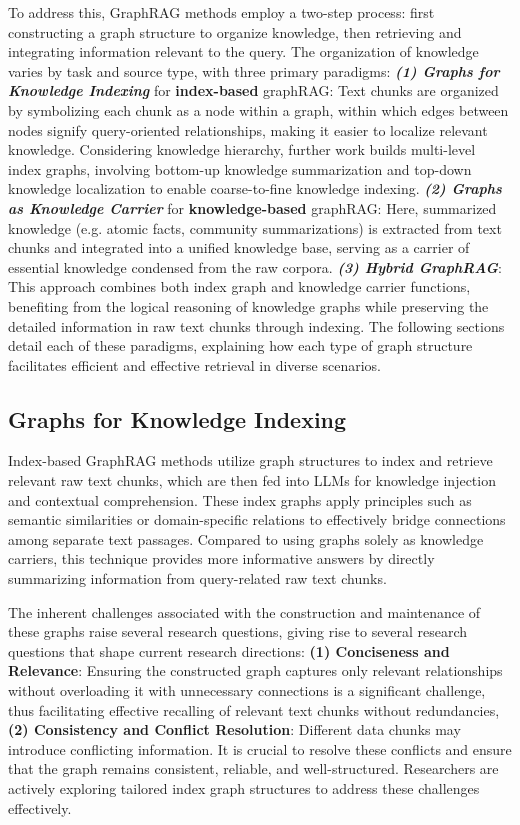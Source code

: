 \documentclass[lettersize,journal]{IEEEtran}
\begin{document}
To address this, GraphRAG methods employ a two-step process: first constructing a graph structure to organize knowledge, then retrieving and integrating information relevant to the query. The organization of knowledge varies by task and source type, with three primary paradigms:
\textbf{\textit{ (1) Graphs for Knowledge Indexing}} for {\bf index-based} graphRAG: Text chunks are organized by symbolizing each chunk as a node within a graph, within which edges between nodes signify query-oriented relationships, making it easier to localize relevant knowledge. Considering knowledge hierarchy, further work builds multi-level index graphs, involving bottom-up knowledge summarization and top-down knowledge localization to enable coarse-to-fine knowledge indexing.
\textbf{ \textit{ (2) Graphs as Knowledge Carrier}} for {\bf knowledge-based} graphRAG: Here, summarized knowledge (e.g. atomic facts, community summarizations) is extracted from text chunks and integrated into a unified knowledge base, serving as a carrier of essential knowledge condensed from the raw corpora.
{\bf \textit{ (3) Hybrid GraphRAG}}: This approach combines both index graph and knowledge carrier functions, benefiting from the logical reasoning of knowledge graphs while preserving the detailed information in raw text chunks through indexing. The following sections detail each of these paradigms, explaining how each type of graph structure facilitates efficient and effective retrieval in diverse scenarios.


\subsection{Graphs for Knowledge Indexing}
Index-based GraphRAG methods utilize graph structures to index and retrieve relevant raw text chunks, which are then fed into LLMs for knowledge injection and contextual comprehension. These index graphs apply principles such as semantic similarities or domain-specific relations to effectively bridge connections among separate text passages. Compared to using graphs solely as knowledge carriers, this technique provides more informative answers by directly summarizing information from query-related raw text chunks.

The inherent challenges associated with the construction and
maintenance of these graphs raise several research questions, giving rise to several research questions that shape current research directions: {\bf (1) 
 Conciseness and Relevance}: Ensuring the constructed graph captures only relevant relationships without overloading it with unnecessary connections is a significant challenge, thus facilitating effective recalling of relevant text chunks without redundancies,
 {\bf (2) Consistency and Conflict Resolution}: Different data chunks may introduce conflicting information. It is crucial to resolve these conflicts and ensure that the graph remains consistent, reliable, and well-structured.
Researchers are actively exploring tailored index graph structures to address these challenges effectively. 
\end{document}
